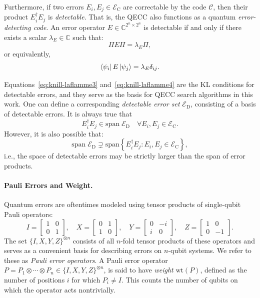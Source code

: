 \documentclass[8pt]{article}
\theoremstyle{definition}
\newcommand{\code}{\mathcal{C}}
\newcommand{\proj}{\Pi}
\newcommand{\ecset}{\mathcal{E}_\textrm{C}}
\newcommand{\edset}{\mathcal{E}_\textrm{D}}
\begin{document}
Furthermore, if two errors \(E_i, E_j \in \ecset\) are correctable by the code \(\code\), then their product \(E_i^\dagger E_j\) is \emph{detectable}. That is, the QECC also functions as a quantum \emph{error-detecting code}. An error operator \(E \in \mathbb{C}^{2^n \times 2^n}\) is detectable if and only if there exists a scalar \(\lambda_E \in \mathbb{C}\) such that:
\begin{equation}
    \proj E \proj = \lambda_E \proj,
    \label{eq:knill-laflamme3}
\end{equation}
or equivalently,
\begin{equation}
    \bra{\psi_i} E \ket{\psi_j} = \lambda_E \delta_{ij}.
    \label{eq:knill-laflamme4}
\end{equation}

Equations~\eqref{eq:knill-laflamme3} and~\eqref{eq:knill-laflamme4} are the KL conditions for detectable errors, and they serve as the basis for QECC search algorithms in this work. One can define a corresponding \emph{detectable error set} \(\edset\), consisting of a basis of detectable errors. It is always true that
\[
    E_i^\dagger E_j \in \mathrm{span}\;\edset \quad \forall E_i, E_j \in \ecset.
\]
However, it is also possible that:
\[
    \mathrm{span}\;\edset \supsetneq \mathrm{span} \left\{ E_i^\dagger E_j : E_i, E_j \in \ecset \right\},
\]
i.e., the space of detectable errors may be strictly larger than the span of error products.

\paragraph{Pauli Errors and Weight.}
Quantum errors are oftentimes modeled using tensor products of single-qubit Pauli operators:
\[
    I = \begin{bmatrix}1 & 0\\ 0 & 1\end{bmatrix},\quad
    X = \begin{bmatrix}0 & 1\\ 1 & 0\end{bmatrix},\quad
    Y = \begin{bmatrix}0 & -i\\ i & 0\end{bmatrix},\quad
    Z = \begin{bmatrix}1 & 0\\ 0 & -1\end{bmatrix}.
\]
The set \(\{I, X, Y, Z\}^{\otimes n}\) consists of all \(n\)-fold tensor products of these operators and serves as a convenient basis for describing errors on \(n\)-qubit systems. We refer to these as \emph{Pauli error operators}.
A Pauli error operator \(P = P_1  \otimes \cdots \otimes P_n \in \{I, X, Y, Z\}^{\otimes n}\), is said to have \emph{weight} \(\mathrm{wt}(P)\), defined as the number of positions \(i\) for which \(P_i \ne I\). This counts the number of qubits on which the operator acts nontrivially.
\end{document}

